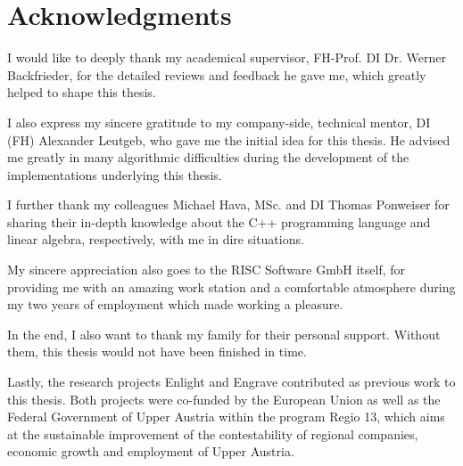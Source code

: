 
\chapter*{Acknowledgments}

I would like to deeply thank my academical supervisor, FH-Prof. DI Dr. Werner Backfrieder, for the detailed reviews and feedback he gave me, which greatly helped to shape this thesis.

I also express my sincere gratitude to my company-side, technical mentor, DI (FH) Alexander Leutgeb, who gave me the initial idea for this thesis.
He advised me greatly in many algorithmic difficulties during the development of the implementations underlying this thesis.

I further thank my colleagues Michael Hava, MSc. and DI Thomas Ponweiser for sharing their in-depth knowledge about the C++ programming language and linear algebra, respectively, with me in dire situations.

My sincere appreciation also goes to the RISC Software GmbH itself, for providing me with an amazing work station and a comfortable atmosphere during my two years of employment which made working a pleasure.

In the end, I also want to thank my family for their personal support.
Without them, this thesis would not have been finished in time.

Lastly, the research projects Enlight and Engrave contributed as previous work to this thesis.
Both projects were co-funded by the European Union as well as the Federal Government of Upper Austria within the program Regio 13, which aims at the sustainable improvement of the contestability of regional companies, economic growth and employment of Upper Austria.

